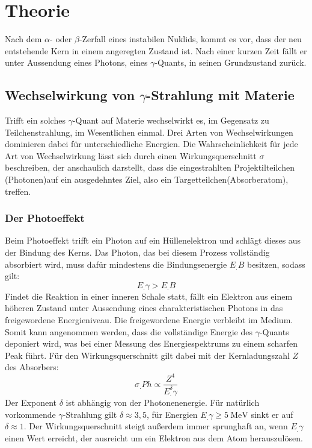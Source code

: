 \section{Theorie}
\label{sec:Theorie}

Nach dem $\alpha$- oder $\beta$-Zerfall eines instabilen Nuklids, kommt es vor, dass der neu entstehende Kern in einem angeregten Zustand ist. Nach einer kurzen Zeit fällt er unter Aussendung eines Photons, eines $\gamma$-Quants, in seinen Grundzustand zurück.

\subsection{Wechselwirkung von $\gamma$-Strahlung mit Materie}

Trifft ein solches $\gamma$-Quant auf Materie wechselwirkt es, im Gegensatz zu Teilchenstrahlung, im Wesentlichen einmal. Drei Arten von Wechselwirkungen dominieren dabei für unterschiedliche Energien. Die Wahrscheinlichkeit für jede Art von Wechselwirkung lässt sich durch einen Wirkungsquerschnitt $\sigma$ beschreiben, der anschaulich darstellt, dass die eingestrahlten Projektilteilchen (Photonen)auf ein ausgedehntes Ziel, also ein Targetteilchen(Absorberatom), treffen.


\subsubsection{Der Photoeffekt}

Beim Photoeffekt trifft ein Photon auf ein Hüllenelektron und schlägt dieses aus der Bindung des Kerns. Das Photon, das bei diesem Prozess vollständig absorbiert wird, muss dafür mindestens die Bindungsenergie $E_.B$ besitzen, sodass gilt:
\[
E_.{\gamma}>E_.B
\]
Findet die Reaktion in einer inneren Schale statt, fällt ein Elektron aus einem höheren Zustand unter Aussendung eines charakteristischen Photons in das freigewordene Energieniveau. Die freigewordene Energie verbleibt im Medium. Somit kann angenommen werden, dass die vollständige Energie des $\gamma$-Quants deponiert wird, was bei einer Messung des Energiespektrums zu einem scharfen Peak führt.
Für den Wirkungsquerschnitt gilt dabei mit der Kernladungszahl $Z$ des Absorbers:
\[
\sigma_.{Ph}\propto\frac{Z^4}{E^{\delta}_.{\gamma}}
\]
Der Exponent $\delta$ ist abhängig von der Photonenenergie. Für natürlich vorkommende $\gamma$-Strahlung gilt $\delta\approx 3,5$, für Energien $E_.{\gamma}\geq \SI{5}{\mega\electronvolt}$ sinkt er auf $\delta\approx 1$.
Der Wirkungsquerschnitt steigt außerdem immer sprunghaft an, wenn $E_.{\gamma}$ einen Wert erreicht, der ausreicht um ein Elektron aus dem Atom herauszulösen.


